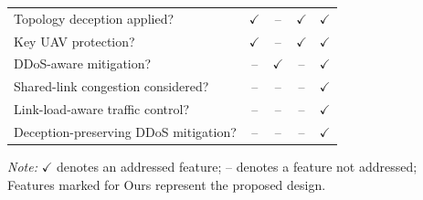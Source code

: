 \begin{ZhChapter}
\begin{table}[htbp]
\begin{tabularx}{\linewidth}{@{}Xcccc@{}}
        Topology deception applied?
        & $\checkmark$ & --
        & $\checkmark$ & $\checkmark$ \\

        Key UAV protection?
        & $\checkmark$ & --
        & $\checkmark$ & $\checkmark$ \\

        DDoS-aware mitigation?
        & -- & $\checkmark$
        & -- & $\checkmark$ \\

        Shared-link congestion considered?
        & -- & --
        & -- & $\checkmark$ \\

        Link-load-aware traffic control?
        & -- & --
        & -- & $\checkmark$ \\

        Deception-preserving DDoS mitigation?
        & -- & --
        & -- & $\checkmark$ \\

        \hline
    \end{tabularx}

    \vspace{2mm}

    \parbox{\linewidth}{
        \footnotesize
        \textit{Note:}
        $\checkmark$ denotes an addressed feature;
        -- denotes a feature not addressed;
        Features marked for Ours represent the proposed design.
    }
\end{table}

\end{ZhChapter}
